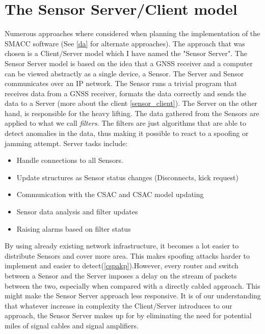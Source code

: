 \documentclass[12pt,english,a4paper]{report}
\begin{document}
\section{The Sensor Server/Client model}
Numerous approaches where considered when planning the implementation of the SMACC software (See \ref{da} for alternate approaches). The approach that was chosen is a Client/Server model which I have named the "Sensor Server". The Sensor Server model is based on the idea that a GNSS receiver and a computer can be viewed abstractly as a single device, a Sensor. The Server and Sensor communicates over an IP network. The Sensor runs a trivial program that receives data from a GNSS receiver, formats the data correctly and sends the data to a Server (more about the client \ref{sensor_client}). The Server on the other hand, is responsible for the heavy lifting. The data gathered from the Sensors are applied to what we call \textit{filters}. The filters are just algorithms that are able to detect anomalies in the data, thus making it possible to react to a spoofing or jamming attempt. Server tasks include:
\begin{itemize}
  \item Handle connections to all Sensors.
  \item Update structures as Sensor status changes (Disconnects, kick request)
  \item Communication with the CSAC and CSAC model updating
  \item Sensor data analysis and filter updates
  \item Raising alarms based on filter status
\end{itemize}
By using already existing network infrastructure, it becomes a lot easier to distribute Sensors and cover more area. This makes spoofing attacks harder to implement and easier to detect(\ref{cspakp}).However, every router and switch between a Sensor and the Server imposes a delay on the stream of packets between the two, especially when compared with a directly cabled approach. This might make the Sensor Server approach less responsive. It is of our understanding that whatever increase in complexity the Client/Server introduces to our approach, the Sensor Server makes up for by eliminating the need for potential miles of signal cables and signal amplifiers. 
\end{document}
